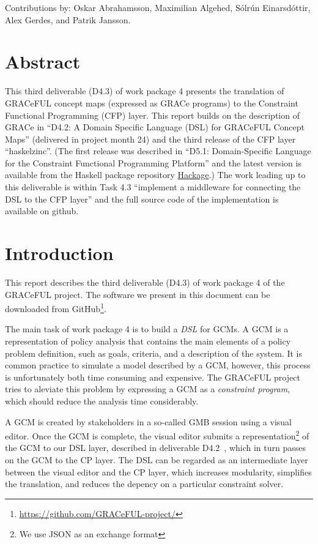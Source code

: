 \documentclass{article}
\newcommand{\grace}{GRACeFUL\xspace}
\begin{document}
Contributions by: Oskar Abrahamsson, Maximilian Algehed, Sólrún
Einarsdóttir, Alex Gerdes, and Patrik Jansson.

\vfill

\setcounter{tocdepth}{2}
\tableofcontents

\vfill

\newpage

\section*{Abstract}\label{abstract}

This third deliverable (D4.3) of work package 4 presents the
translation of GRACeFUL concept maps (expressed as GRACe programs) to
the Constraint Functional Programming (CFP) layer.
%
This report builds on the description of GRACe in ``D4.2: A Domain
Specific Language (DSL) for GRACeFUL Concept Maps'' (delivered in
project month 24) and the third release of the CFP layer ``haskelzinc''.
%
(The first release was described in ``D5.1: Domain-Specific Language
for the Constraint Functional Programming Platform'' and the latest
version is available from the Haskell package repository
\href{https://hackage.haskell.org/package/haskelzinc}{Hackage}.)
%
The work leading up to this deliverable is within Task 4.3 ``implement
a middleware for connecting the DSL to the CFP layer'' and the full
source code of the implementation is available on github.


\section{Introduction}

This report describes the third deliverable (D4.3) of work package 4 of the
\grace project. The software we present in this document can be downloaded
from GitHub\footnote{\url{https://github.com/GRACeFUL-project/}}.

The main task of work package 4 is to build a \emph{\ac{DSL}} for \acp{GCM}. A
\ac{GCM} is a representation of policy analysis that contains the main elements
of a policy problem definition, such as goals, criteria, and a description of
the system. It is common practice to simulate a model described by a \ac{GCM},
however, this process is unfortunately both time consuming and expensive. The
\grace project tries to aleviate this problem by expressing a \ac{GCM} as a
\emph{constraint program}, which should reduce the analysis time considerably.

A \ac{GCM} is created by stakeholders in a so-called \ac{GMB} session using a
visual editor. Once the \ac{GCM} is complete, the visual editor submits a
representation\footnote{We use \ac{JSON} as an exchange format} of the \ac{GCM}
to our \ac{DSL} layer, described in deliverable D4.2~\cite{D4.2}, which in turn
passes on the \ac{GCM} to the \ac{CP} layer. The \ac{DSL} can be regarded as an
intermediate layer between the visual editor and the \ac{CP} layer, which
increases modularity, simplifies the translation, and reduces the depency on a
particular constraint solver. 
\end{document}
